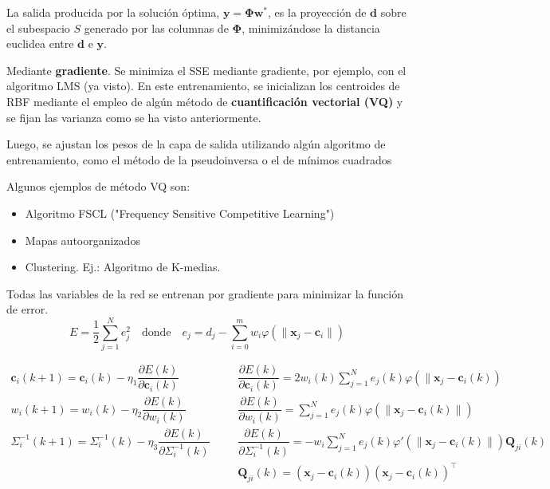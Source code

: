 La salida producida por la solución óptima, $\mathbf{y=\Phi w^*}$, es la proyección de $\mathbf{d}$ sobre el subespacio $S$ generado por las columnas de $\mathbf{\Phi}$, minimizándose la distancia euclidea entre $\mathbf{d}$ e $\mathbf{y}$.

Mediante \textbf{gradiente}. Se minimiza el SSE mediante gradiente, por ejemplo, con el algoritmo LMS (ya visto).
En este entrenamiento, se inicializan los centroides de RBF mediante el empleo de algún método de \textbf{cuantificación vectorial (VQ)} y se fijan las varianza como se ha visto anteriormente.

Luego, se ajustan los pesos de la capa de salida utilizando algún algoritmo de entrenamiento, como el método de la pseudoinversa o el de mínimos cuadrados

Algunos ejemplos de método VQ son:
\begin{itemize}
\item Algoritmo FSCL ("Frequency Sensitive Competitive Learning")
\item Mapas autoorganizados
\item Clustering. Ej.: Algoritmo de K-medias.
\end{itemize}
Todas las variables de la red se entrenan por gradiente para minimizar la función de error. \[ \boxed{E=\dfrac{1}{2}\sum_{j=1}^{N}e_j^2}\quad\mathrm{donde}\quad e_j=d_j-\sum_{i=0}^{m}w_i\varphi(\|\mathbf{x}_j-\mathbf{c}_i\|) \]

\[ \begin{array}{rcl}
	\mathbf{c}_i(k+1)=\mathbf{c}_i(k)-\eta_1\dfrac{\partial E(k)}{\partial \mathbf{c}_i(k)} & ~~~~ &\dfrac{\partial E(k)}{\partial \mathbf{c}_i(k)}=2w_i(k)\sum_{j=1}^Ne_j(k)\varphi(\|\mathbf{x}_j-\mathbf{c}_i(k)) \\
	w_{i}(k+1)=w_{i}(k)-\eta_{2}\dfrac{ \partial E(k) }{ \partial w_{i}(k) }  & &\dfrac{ \partial E(k) }{ \partial w_{i}(k) }=\sum_{j=1}^{N}e_{j}(k)\varphi(\|\mathbf{x}_{j}-\mathbf{c}_{i}(k) \|)  \\
	\Sigma_{i}^{-1}(k+1)=\Sigma_{i}^{-1}(k)-\eta_{3}\dfrac{ \partial E(k) }{ \partial \Sigma_{i}^{-1}(k) }  & &\dfrac{ \partial E(k) }{ \partial \Sigma_{i}^{-1}(k) } =-w_{i}\sum_{j=1}^{N}e_{j}(k)\varphi'(\|\mathbf{x}_{j}-\mathbf{c}_{i}(k)\|)\mathbf{Q}_{ji}(k) \\
	& & \mathbf{Q}_{ji}(k)=(\mathbf{x}_{j}-\mathbf{c}_{i}(k))(\mathbf{x}_{j}-\mathbf{c}_{i}(k))^{\intercal}
\end{array}  \]
